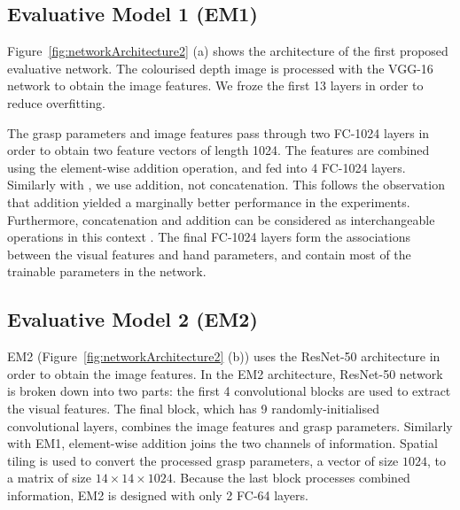 \subsection{Evaluative Model 1 (EM1)}
\noindent
Figure~\ref{fig:networkArchitecture2} (a) shows the architecture of the first proposed evaluative network. The colourised depth image is processed with the VGG-16 network \cite{Simonyan14c} to obtain the image features. We froze the first 13 layers in order to reduce overfitting.

The grasp parameters and image features pass through two FC-1024 layers in order to obtain two feature vectors of length 1024. The features are combined using the element-wise addition operation, and fed into 4 FC-1024 layers. Similarly with \cite{Levine1}, we use addition, not concatenation. This follows the observation that addition yielded a marginally better performance in the experiments. Furthermore, concatenation and addition can be considered as interchangeable operations in this context \cite{dumoulin2018feature-wise}. The final FC-1024 layers form the associations between the visual features and hand parameters, and contain most of the trainable parameters in the network.

\subsection{Evaluative Model 2 (EM2)}
\noindent

EM2 (Figure~\ref{fig:networkArchitecture2} (b)) uses the ResNet-50 architecture in order to obtain the image features. In the EM2 architecture, ResNet-50 network is broken down into two parts: the first 4 convolutional blocks are used to extract the visual features. The final block, which has 9 randomly-initialised convolutional layers, combines the image features and grasp parameters. Similarly with EM1, element-wise addition joins the two channels of information. Spatial tiling is used to convert the processed grasp parameters, a vector of size $1024$, to a matrix of size $14 \times 14 \times 1024$. Because the last block processes combined information, EM2 is designed with only 2 FC-64 layers.

